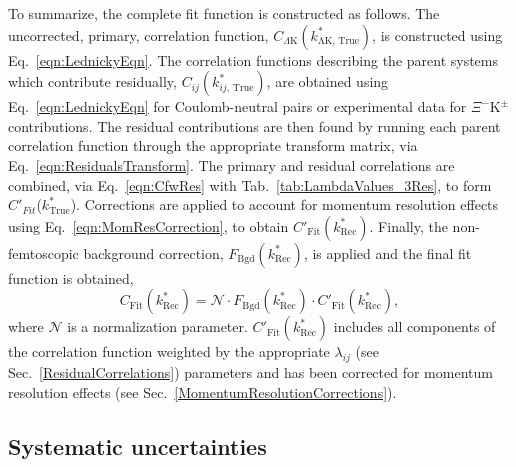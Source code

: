 \documentclass[ALICE,manyauthors]{cernphprep}
\newcommand{\ktrue}{$k^{*}_{\mathrm{True}}$\xspace}
\newcommand{\XiKpm}{$\Xi^{-}\mathrm{K^{\pm}}$\xspace}
\begin{document}
To summarize, the complete fit function is constructed as follows.
The uncorrected, primary, correlation function, $C_{\Lambda\mathrm{K}}(k^{*}_{\mathrm{\Lambda K,\,True}})$, is constructed using Eq.\ \ref{eqn:LednickyEqn}.
The correlation functions describing the parent systems which contribute residually, $C_{ij}(k^{*}_{ij,\,\mathrm{True}})$, are obtained using Eq.\ \ref{eqn:LednickyEqn} for Coulomb-neutral pairs or experimental data for \XiKpm contributions.
The residual contributions are then found by running each parent correlation function through the appropriate transform matrix, via Eq.\ \ref{eqn:ResidualsTransform}.
The primary and residual correlations are combined, via Eq.\ \ref{eqn:CfwRes} with Tab.\ \ref{tab:LambdaValues_3Res}, to form $C'_{Fit}$(\ktrue).
Corrections are applied to account for momentum resolution effects using Eq.\ \ref{eqn:MomResCorrection}, to obtain $C'_{\mathrm{Fit}}(k^{*}_{\mathrm{Rec}})$.
Finally, the non-femtoscopic background correction, $F_{\mathrm{Bgd}}(k^{*}_{\mathrm{Rec}})$, is applied and the final fit function is obtained,
\begin{equation}
C_{\mathrm{Fit}}(k^{*}_{\mathrm{Rec}}) = \mathcal{N}\cdot F_{\mathrm{Bgd}}(k^{*}_{\mathrm{Rec}})\cdot C'_{\mathrm{Fit}}(k^{*}_{\mathrm{Rec}}),
\end{equation}
where $\mathcal{N}$ is a normalization parameter.
$C'_{\mathrm{Fit}}(k^{*}_{\mathrm{Rec}})$ includes all components of the correlation function weighted by the appropriate $\lambda_{ij}$ (see Sec.\ \ref{ResidualCorrelations}) parameters and has been corrected for momentum resolution effects (see Sec.\ \ref{MomentumResolutionCorrections}).

\subsection{Systematic uncertainties}
\label{SysErrs}
\end{document}
